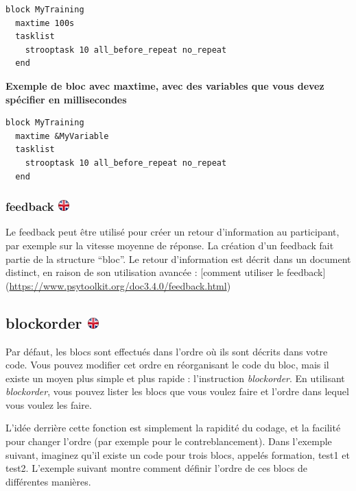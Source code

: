 \documentclass[
]{book}
\begin{document}
\begin{verbatim}
block MyTraining
  maxtime 100s
  tasklist
    strooptask 10 all_before_repeat no_repeat
  end
\end{verbatim}

\textbf{Exemple de bloc avec maxtime, avec des variables que vous devez spécifier en millisecondes}

\begin{verbatim}
block MyTraining
  maxtime &MyVariable
  tasklist
    strooptask 10 all_before_repeat no_repeat
  end
\end{verbatim}

\hypertarget{feedback}{%
\subsubsection[feedback ]{\texorpdfstring{feedback \href{https://www.psytoolkit.org/doc3.4.0/syntax.html\#block-feedback}{\protect\includegraphics{img/ukflag.png}}}{feedback }}\label{feedback}}

Le feedback peut être utilisé pour créer un retour d'information au participant, par exemple sur la vitesse moyenne de réponse. La création d'un feedback fait partie de la structure ``bloc''. Le retour d'information est décrit dans un document distinct, en raison de son utilisation avancée : {[}comment utiliser le feedback{]} (\url{https://www.psytoolkit.org/doc3.4.0/feedback.html})

\hypertarget{blockorder}{%
\subsection[blockorder ]{\texorpdfstring{blockorder \href{https://www.psytoolkit.org/doc3.4.0/syntax.html\#blockorder}{\protect\includegraphics{img/ukflag.png}}}{blockorder }}\label{blockorder}}

Par défaut, les blocs sont effectués dans l'ordre où ils sont décrits dans votre code. Vous pouvez modifier cet ordre en réorganisant le code du bloc, mais il existe un moyen plus simple et plus rapide : l'instruction \emph{blockorder}. En utilisant \emph{blockorder}, vous pouvez lister les blocs que vous voulez faire et l'ordre dans lequel vous voulez les faire.

L'idée derrière cette fonction est simplement la rapidité du codage, et la facilité pour changer l'ordre (par exemple pour le contreblancement). Dans l'exemple suivant, imaginez qu'il existe un code pour trois blocs, appelés formation, test1 et test2. L'exemple suivant montre comment définir l'ordre de ces blocs de différentes manières.
\end{document}
